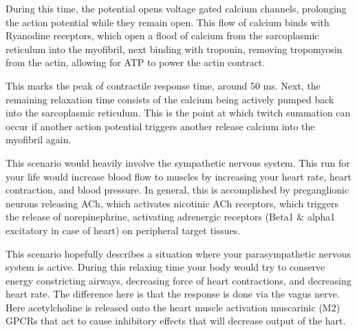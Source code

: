 \documentclass[plain,basic]{inVerba-notes}
\begin{document}
\begin{enumerate}
  During this time, the potential opens voltage gated calcium channels, prolonging the action potential while they remain open. This flow of calcium binds with Ryanodine receptors, which open a flood of calcium from the sarcoplasmic reticulum into the myofibril, next binding with troponin, removing tropomyosin from the actin, allowing for ATP to power the actin contract.

  This marks the peak of contractile response time, around 50 ms. Next, the remaining relaxation time consists of the calcium being actively pumped back into the sarcoplasmic reticulum. This is the point at which twitch summation can occur if another action potential triggers another release calcium into the myofibril again.

  \begin{itemize}

    This scenario would heavily involve the sympathetic nervous system. This run for your life would increase blood flow to muscles by increasing your heart rate, heart contraction, and blood pressure. In general, this is accomplished by preganglionic neurons releasing ACh, which activates nicotinic ACh receptors, which triggers the release of norepinephrine, activating adrenergic receptors (Beta1 \& alpha1 excitatory in case of heart) on peripheral target tissues.




    This scenario hopefully describes a situation where your parasympathetic nervous system is active. During this relaxing time your body would try to conserve energy constricting airways, decreasing force of heart contractions, and decreasing heart rate. The difference here is that the response is done via the vagus nerve. Here acetylcholine is released onto the heart muscle activation muscarinic (M2) GPCRs that act to cause inhibitory effects that will decrease output of the hart.
  \end{itemize}



\end{enumerate}
\end{document}
